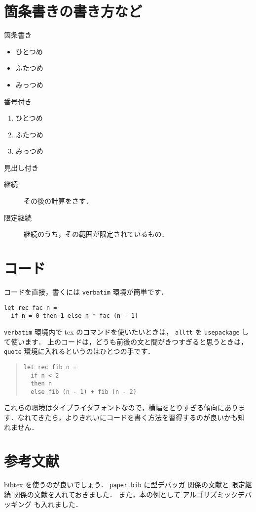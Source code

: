 \documentclass[twoside, twocolumn, a4paper]{jarticle}
\begin{document}
\section{箇条書きの書き方など}\label{sec:kajogaki}
箇条書き
\begin{itemize}
       \item ひとつめ
       \item ふたつめ
       \item みっつめ
\end{itemize}
番号付き
\begin{enumerate}
       \item ひとつめ
       \item ふたつめ
       \item みっつめ
\end{enumerate}
見出し付き
\begin{description}
       \item[継続] その後の計算をさす．
       \item[限定継続] 継続のうち，その範囲が限定されているもの．
\end{description}

\section{コード}\label{sec:code}
コードを直接，書くには \texttt{verbatim} 環境が簡単です．
\begin{verbatim}
let rec fac n =
  if n = 0 then 1 else n * fac (n - 1)
\end{verbatim}
\texttt{verbatim} 環境内で tex のコマンドを使いたいときは，
\texttt{alltt} を \texttt{usepackage} して使います．
上のコードは，どうも前後の文と間がきつすぎると思うときは，
\texttt{quote} 環境に入れるというのはひとつの手です．
\begin{quote}
\begin{verbatim}
let rec fib n =
  if n < 2
  then n
  else fib (n - 1) + fib (n - 2)
\end{verbatim}
\end{quote}

これらの環境はタイプライタフォントなので，横幅をとりすぎる傾向にありま
す．なれてきたら，よりきれいにコードを書く方法を習得するのが良いかも知
れません．

\section{参考文献}\label{sec:bunken}
bibtex を使うのが良いでしょう．
\texttt{paper.bib} に型デバッガ \cite{TA2013} 関係の文献と
限定継続 \cite{DF1989, DF1990} 関係の文献を入れておきました．
また，本の例として
アルゴリズミックデバッギング \cite{Shapiro1983} も入れました．
\end{document}
